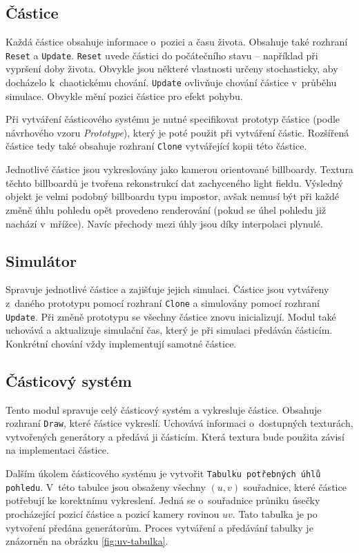 \subsection*{Částice} Každá částice obsahuje informace o~pozici a času života. Obsahuje také rozhraní \texttt{Reset} a \texttt{Update}. \texttt{Reset} uvede částici do počátečního stavu -- například při vypršení doby života. Obvykle jsou některé vlastnosti určeny stochasticky, aby docházelo k~chaotickému chování. \texttt{Update} ovlivňuje chování částice v~průběhu simulace. Obvykle mění pozici částice pro efekt pohybu. 

Při vytváření částicového systému je nutné specifikovat prototyp částice (podle návrhového vzoru \emph{Prototype}), který je poté použit při vytváření částic. Rozšířená částice tedy také obsahuje rozhraní \texttt{Clone} vytvářející kopii této částice. 

Jednotlivé částice jsou vykreslovány jako kamerou orientované billboardy. Textura těchto billboardů je tvořena rekonstrukcí dat zachyceného light fieldu. Výsledný objekt je velmi podobný billboardu typu impostor, avšak nemusí být při každé změně úhlu pohledu opět provedeno renderování (pokud se úhel pohledu již nachází v~mřížce). Navíc přechody mezi úhly jsou díky interpolaci plynulé.

\subsection*{Simulátor} Spravuje jednotlivé částice a zajišťuje jejich simulaci. Částice jsou vytvářeny z~daného prototypu pomocí rozhraní \texttt{Clone} a simulovány pomocí rozhraní \texttt{Update}. Při změně prototypu se všechny částice znovu inicializují. Modul také uchovává a aktualizuje simulační čas, který je při simulaci předáván částicím. Konkrétní chování vždy implementují samotné částice. 


\subsection*{Částicový systém} Tento modul spravuje celý částicový systém a vykresluje částice. Obsahuje rozhraní \texttt{Draw}, které částice vykreslí. Uchovává informaci o~dostupných texturách, vytvořených generátory a předává ji částicím. Která textura bude použita závisí na implementaci částice. 

Dalším úkolem částicového systému je vytvořit \texttt{Tabulku potřebných úhlů pohledu}. V~této tabulce jsou obsaženy všechny ${(u,v)}$ souřadnice, které částice potřebují ke korektnímu vykreslení. Jedná se o~souřadnice průniku úsečky procházející pozicí částice a pozicí kamery rovinou ${uv}$. Tato tabulka je po vytvoření předána generátorům. Proces vytváření a předávání tabulky je znázorněn na obrázku \ref{fig:uv-tabulka}.

